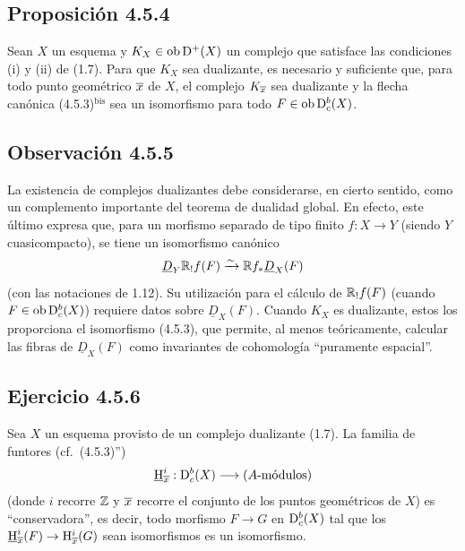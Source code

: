 \subsection*{Proposición 4.5.4}
Sean $X$ un esquema y $K_X\in\operatorname{ob}\mathrm{D}^+(X)$ un complejo que satisface las condiciones (i) y (ii) de (1.7). Para que $K_X$ sea dualizante, es necesario y suficiente que, para todo punto geométrico $\overline{x}$ de $X$, el complejo $K_{\overline{x}}$ sea dualizante y la flecha canónica (4.5.3)$^{\mathrm{bis}}$ sea un isomorfismo para todo $F\in\operatorname{ob}\mathrm{D}_c^b(X)$.

\subsection*{Observación 4.5.5}
La existencia de complejos dualizantes debe considerarse, en cierto sentido, como un complemento importante del teorema de dualidad global. En efecto, este último expresa que, para un morfismo separado de tipo finito $f:X\to Y$ (siendo $Y$ cuasicompacto), se tiene un isomorfismo canónico
\[
\underline{D}_Y\mathbb{R}_!f(F)\xrightarrow{\sim}\mathbb{R} f_*\underline{D}_X(F)
\]
(con las notaciones de 1.12). Su utilización para el cálculo de $\mathbb{R}_!f(F)$ (cuando $F\in\operatorname{ob}\mathrm{D}_c^b(X)$) requiere datos sobre $\underline{D}_X(F)$. Cuando $K_X$ es dualizante, estos los proporciona el isomorfismo (4.5.3), que permite, al menos teóricamente, calcular las fibras de $\underline{D}_X(F)$ como invariantes de cohomología ``puramente espacial''.

\subsection*{Ejercicio 4.5.6}
Sea $X$ un esquema provisto de un complejo dualizante (1.7). La familia de funtores (cf.~(4.5.3)'')
\[
\underline{\mathrm{H}}_{\overline{x}}^i:\mathrm{D}_c^b(X)\longrightarrow (A\text{-módulos})
\]
(donde $i$ recorre $\mathbb{Z}$ y $\overline{x}$ recorre el conjunto de los puntos geométricos de $X$) es ``conservadora'', es decir, todo morfismo $F\to G$ en $\mathrm{D}_c^b(X)$ tal que los $\underline{\mathrm H}_{\overline{x}}^i(F)\to\mathrm{H}_{\overline{x}}^i(G)$ sean isomorfismos es un isomorfismo.
